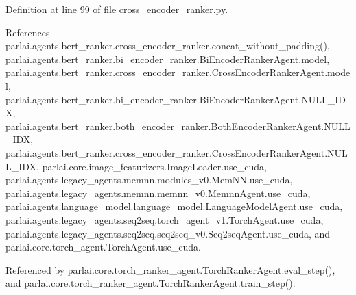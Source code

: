 Definition at line 99 of file cross\+\_\+encoder\+\_\+ranker.\+py.



References parlai.\+agents.\+bert\+\_\+ranker.\+cross\+\_\+encoder\+\_\+ranker.\+concat\+\_\+without\+\_\+padding(), parlai.\+agents.\+bert\+\_\+ranker.\+bi\+\_\+encoder\+\_\+ranker.\+Bi\+Encoder\+Ranker\+Agent.\+model, parlai.\+agents.\+bert\+\_\+ranker.\+cross\+\_\+encoder\+\_\+ranker.\+Cross\+Encoder\+Ranker\+Agent.\+model, parlai.\+agents.\+bert\+\_\+ranker.\+bi\+\_\+encoder\+\_\+ranker.\+Bi\+Encoder\+Ranker\+Agent.\+N\+U\+L\+L\+\_\+\+I\+DX, parlai.\+agents.\+bert\+\_\+ranker.\+both\+\_\+encoder\+\_\+ranker.\+Both\+Encoder\+Ranker\+Agent.\+N\+U\+L\+L\+\_\+\+I\+DX, parlai.\+agents.\+bert\+\_\+ranker.\+cross\+\_\+encoder\+\_\+ranker.\+Cross\+Encoder\+Ranker\+Agent.\+N\+U\+L\+L\+\_\+\+I\+DX, parlai.\+core.\+image\+\_\+featurizers.\+Image\+Loader.\+use\+\_\+cuda, parlai.\+agents.\+legacy\+\_\+agents.\+memnn.\+modules\+\_\+v0.\+Mem\+N\+N.\+use\+\_\+cuda, parlai.\+agents.\+legacy\+\_\+agents.\+memnn.\+memnn\+\_\+v0.\+Memnn\+Agent.\+use\+\_\+cuda, parlai.\+agents.\+language\+\_\+model.\+language\+\_\+model.\+Language\+Model\+Agent.\+use\+\_\+cuda, parlai.\+agents.\+legacy\+\_\+agents.\+seq2seq.\+torch\+\_\+agent\+\_\+v1.\+Torch\+Agent.\+use\+\_\+cuda, parlai.\+agents.\+legacy\+\_\+agents.\+seq2seq.\+seq2seq\+\_\+v0.\+Seq2seq\+Agent.\+use\+\_\+cuda, and parlai.\+core.\+torch\+\_\+agent.\+Torch\+Agent.\+use\+\_\+cuda.



Referenced by parlai.\+core.\+torch\+\_\+ranker\+\_\+agent.\+Torch\+Ranker\+Agent.\+eval\+\_\+step(), and parlai.\+core.\+torch\+\_\+ranker\+\_\+agent.\+Torch\+Ranker\+Agent.\+train\+\_\+step().

